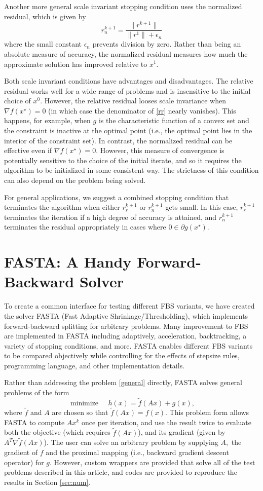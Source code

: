 \documentclass{amsart}
\newcommand{\eqb}[1]{\begin{equation}\label{#1}}
\newcommand{\eqe}{\end{equation}}
\newcommand{\eqn}[2]{\begin{equation}\label{#1}#2\end{equation}}
\newcommand{\kp}{^{k+1}}
\newcommand{\opt}{^\star}
\DeclareMathOperator*{\minimize}{minimize\quad}
\theoremstyle{definition}
\begin{document}
Another more general scale invariant stopping condition uses the normalized residual, which is given by 
\eqn{rn}{r\kp_n = \frac{\|r\kp\|}{\|r^1\|+\epsilon_n}}
where the small constant  $\epsilon_n$ prevents division by zero. Rather than being an absolute measure of accuracy, the normalized residual measures how much the approximate solution has improved relative to $x^1.$

Both scale invariant conditions have advantages and disadvantages.  The relative residual works well for a wide range of problems and is insensitive to the initial choice of $x^0.$  However, the relative residual looses scale invariance when $\nabla f(x\opt)=0$ (in which case the denominator of \eqref{rr} nearly vanishes).  This happens, for example, when $g$ is the characteristic function of a convex set and the constraint is inactive at the optimal point (i.e., the optimal point lies in the interior of the constraint set).  In contrast, the normalized residual can be effective even if $\nabla f(x\opt)=0.$  However, this measure of convergence is potentially sensitive to the choice of the initial iterate, and so it requires the algorithm to be initialized in some consistent way.  The strictness of this condition can also depend on the problem being solved.

For general applications, we suggest a combined stopping condition that terminates the algorithm when either $r\kp_r$ or  $r\kp_n$ gets small.  In this case, $r\kp_r$ terminates the iteration if a high degree of accuracy is attained, and $r\kp_n$ terminates the residual appropriately in cases where $0\in \partial g(x\opt).$



\section{FASTA:  A Handy Forward-Backward Solver}
To create a common interface for testing different FBS variants, we have created the solver FASTA (Fast Adaptive Shrinkage/Thresholding), which implements forward-backward splitting for arbitrary problems. Many improvement to FBS are implemented in FASTA including adaptively, acceleration, backtracking, a variety of stopping conditions, and more.  FASTA enables different FBS variants to be compared objectively while controlling for the effects of stepsize rules, programming language, and other implementation details.  

Rather than addressing the problem \eqref{general} directly, FASTA solves general problems of the form
\eqb{general_fasta}
\minimize h(x) =  \tilde f(Ax)+g(x),
\eqe 
where $\tilde f$ and $A$ are chosen so that $\tilde f(Ax) = f(x).$  This problem form allows FASTA to compute $Ax^k$ once per iteration, and use the result twice to evaluate both the objective (which requires $\tilde f(Ax)$), and its gradient (given by $A^T\nabla \tilde f(Ax)$). The user can solve an arbitrary problem by supplying $A,$ the gradient of $f$ and the proximal mapping (i.e., backward gradient descent operator) for $g$.  However, custom wrappers are provided that solve all of the test problems described in this article, and codes are provided to reproduce the results in Section \ref{sec:num}.
\end{document}

